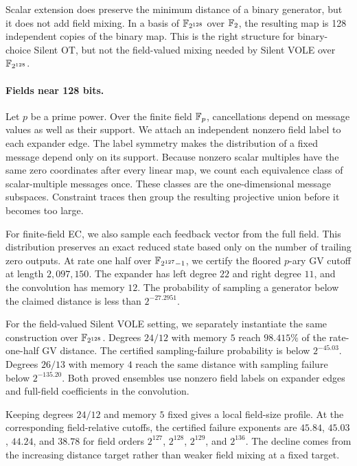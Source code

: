 Scalar extension does preserve the minimum distance of a binary generator,
but it does not add field mixing.  In a basis of $\mathbb F_{2^{128}}$ over $\mathbb F_2$,
the resulting map is 128 independent copies of the binary map.  This is the
right structure for binary-choice Silent OT, but not the field-valued mixing
needed by Silent VOLE over $\mathbb F_{2^{128}}$.

\paragraph{Fields near 128 bits.}
Let $p$ be a prime power.  Over the finite field $\mathbb F_p$, cancellations depend
on message values as well as their support.
We attach an independent nonzero field label to each expander edge.  The label
symmetry makes the distribution of a fixed message depend only on its support.
Because nonzero scalar multiples have the same zero coordinates after every
linear map, we count each equivalence class of scalar-multiple messages once.
These classes are the one-dimensional message subspaces.
Constraint traces then group the resulting projective union before it becomes
too large.

For finite-field EC, we also sample each feedback vector from the full field.
This distribution preserves an exact reduced state based only on the number
of trailing zero outputs.  At rate one half over $\mathbb F_{2^{127}-1}$, we certify
the floored $p$-ary GV cutoff at length $2{,}097{,}150$.  The expander has
left degree $22$ and right degree $11$, and the convolution has memory $12$.
The probability of sampling a generator below the claimed distance is less
than $2^{-27.2951}$.

For the field-valued Silent VOLE setting, we separately instantiate the same
construction over $\mathbb F_{2^{128}}$.  Degrees $24/12$ with memory $5$ reach
$98.415\%$ of the rate-one-half GV distance.  The certified sampling-failure
probability is below $2^{-45.03}$.  Degrees $26/13$ with memory $4$ reach the
same distance with sampling failure below $2^{-135.20}$.  Both proved
ensembles use nonzero field labels on expander edges and full-field
coefficients in the convolution.

Keeping degrees $24/12$ and memory $5$ fixed gives a local field-size
profile.  At the corresponding field-relative cutoffs, the certified failure
exponents are $45.84$, $45.03$, $44.24$, and $38.78$ for field orders
$2^{127}$, $2^{128}$, $2^{129}$, and $2^{136}$.  The decline comes from the
increasing distance target rather than weaker field mixing at a fixed target.

